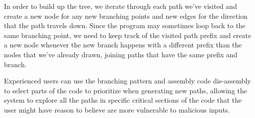 In order to build up the tree, we iterate through each path we've visited and
create a new node for any new branching points and new edges for the direction
that the path travels down. Since the program may sometimes loop back to the
same branching point, we need to keep track of the visited path prefix and
create a new node whenever the new branch happens with a different prefix than
the nodes that we've already drawn, joining paths that have the same prefix and
branch.

Experienced users can use the branching pattern and assembly code dis-assembly to
select parts of the code to prioritize when generating new paths, allowing the
system to explore all the paths in specific critical sections of the code that
the user might have reason to believe are more vulnerable to malicious inputs.

